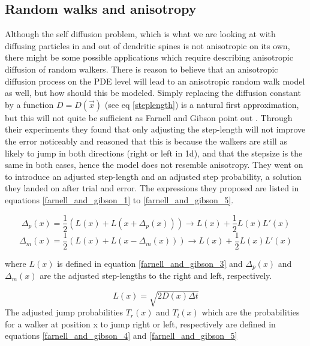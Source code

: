 \subsection{Random walks and anisotropy}\label{random_walks_and_anisotropy}

Although the self diffusion problem, which is what we are looking at with diffusing particles in and out of dendritic spines is not anisotropic on its own, there might be some possible applications which require describing anisotropic diffusion of random walkers.
There is reason to believe that an anisotropic diffusion process on the PDE level will lead to an anisotropic random walk model as well, but how should this be modeled. 
Simply replacing the diffusion constant by a function $D = D(\vec{x})$ (see eq \eqref{steplength}) is a natural first approximation, but this will not quite be sufficient as Farnell and Gibson point out \cite{farnell2005monte}. 
Through their experiments they found that only adjusting the step-length will not improve the error noticeably and reasoned that this is because the walkers are still as likely to jump in both directions (right or left in 1d), and that the stepsize is the same in both cases, hence the model does not resemble anisotropy. 
They went on to introduce an adjusted step-length and an adjusted step probability, a solution they landed on after trial and error. 
The expressions they proposed are listed in equations \eqref{farnell_and_gibson_1} to \eqref{farnell_and_gibson_5}. 

\begin{equation}\label{farnell_and_gibson_1}
 \Delta_p(x) = \frac{1}{2}\left(L(x) + L(x +\Delta_p(x))\right) \to L(x) +\frac{1}{2}L(x)L'(x)
\end{equation}
\begin{equation}\label{farnell_and_gibson_2}
 \Delta_m(x) = \frac{1}{2}\left(L(x) + L(x -\Delta_m(x))\right) \to L(x) +\frac{1}{2}L(x)L'(x)
\end{equation}

where $L(x)$ is defined in equation \ref{farnell_and_gibson_3} and $\Delta_p(x)$ and $\Delta_m(x)$ are the adjusted step-lengths to the right and left, respectively.

\begin{equation}\label{farnell_and_gibson_3}
L(x) = \sqrt{2D(x)\Delta t}
\end{equation}
The adjusted jump probabilities $T_r(x)$ and $T_l(x)$ which are the probabilities for a walker at position x to jump right or left, respectively are defined in equations \eqref{farnell_and_gibson_4} and \eqref{farnell_and_gibson_5}

